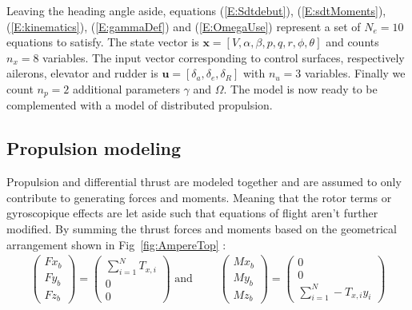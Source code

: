 Leaving the heading angle aside, equations (\ref{E:Sdtdebut}), (\ref{E:sdtMoments}), (\ref{E:kinematics}), (\ref{E:gammaDef}) and (\ref{E:OmegaUse}) represent a set of $N_e=10$ equations to satisfy. The state vector is $\textbf{x}=[V,\alpha,\beta,p,q,r,\phi,\theta]$ and counts $n_x=8$ variables. The input vector corresponding to control surfaces, respectively ailerons, elevator and rudder is $\textbf{u}=[\delta_a, \delta_e, \delta_R]$ with $n_u=3$ variables. Finally we count $n_p=2$ additional parameters $\gamma$ and $\Omega$. The model is now ready to be complemented with a model of distributed propulsion.

\subsection{Propulsion modeling}

Propulsion and differential thrust are modeled together and are assumed to only contribute to generating forces and moments. Meaning that the rotor terms or gyroscopique effects are let aside such that equations of flight aren't further modified.
By summing the thrust forces and moments based on the geometrical arrangement shown in Fig~\ref{fig:AmpereTop} :
\begin{align}
\begin{pmatrix}
Fx_b\\
Fy_b\\
Fz_b
\end{pmatrix}
=
\begin{pmatrix}
\sum_{i=1}^{N} T_{x,i}\\
0\\
0
\end{pmatrix}
\text{ and }
\qquad
\begin{pmatrix}
Mx_b\\
My_b\\
Mz_b
\end{pmatrix}
=\begin{pmatrix}
0\\
0\\
\sum_{i=1}^{N} -T_{x,i} y_i
\end{pmatrix}
\end{align}

